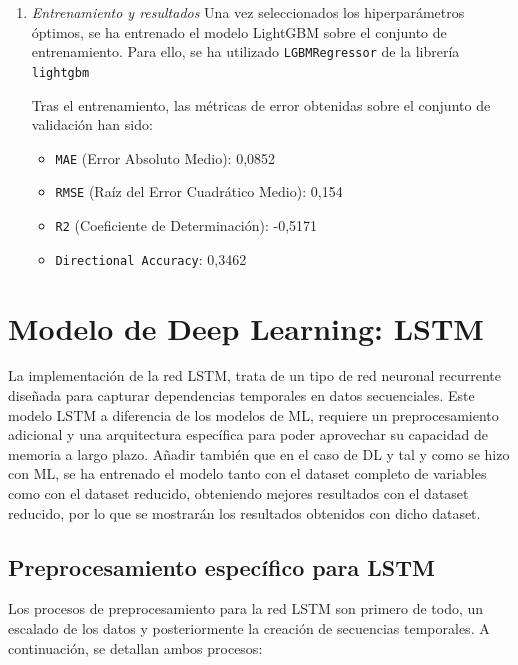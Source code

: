 \begin{enumerate}
    \item \emph{Entrenamiento y resultados}
    Una vez seleccionados los hiperparámetros óptimos, se ha entrenado el modelo LightGBM sobre el conjunto de entrenamiento. Para ello, se ha utilizado \texttt{LGBMRegressor} de la librería \texttt{lightgbm} \cite{lightgbm}

    Tras el entrenamiento, las métricas de error obtenidas sobre el conjunto de validación han sido:

    \begin{itemize}
        \item \texttt{MAE} (Error Absoluto Medio): 0,0852
        \item \texttt{RMSE} (Raíz del Error Cuadrático Medio): 0,154
        \item \texttt{R2} (Coeficiente de Determinación): -0,5171
        \item \texttt{Directional Accuracy}: 0,3462
    \end{itemize}
\end{enumerate}

\section{Modelo de Deep Learning: LSTM}
La implementación de la red LSTM, trata de un tipo de red neuronal recurrente diseñada para capturar dependencias temporales en datos secuenciales. Este modelo LSTM a diferencia de los modelos de ML, requiere un preprocesamiento adicional y una arquitectura específica para poder aprovechar su capacidad de memoria a largo plazo. Añadir también que en el caso de DL y tal y como se hizo con ML, se ha entrenado el modelo tanto con el dataset completo de variables como con el dataset reducido, obteniendo mejores resultados con el dataset reducido, por lo que se mostrarán los resultados obtenidos con dicho dataset.

\subsection{Preprocesamiento específico para LSTM}
Los procesos de preprocesamiento para la red LSTM son primero de todo, un escalado de los datos \cite{escalado_datos} y posteriormente la creación de secuencias temporales. A continuación, se detallan ambos procesos:

